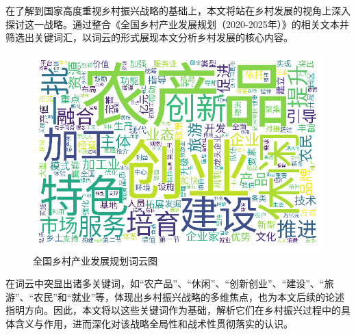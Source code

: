 在了解到国家高度重视乡村振兴战略的基础上，本文将站在乡村发展的视角上深入探讨这一战略。通过整合《全国乡村产业发展规划（2020-2025年）》的相关文本并筛选出关键词汇，以词云的形式展现本文分析乡村发展的核心内容。

\begin{figure}[H]
    \centering
    \includegraphics[width=0.6\linewidth]{figures/46.png}
    \caption{全国乡村产业发展规划词云图}
    \label{fig:enter-label}
\end{figure}

在词云中突显出诸多关键词，如“农产品”、“休闲”、“创新创业”、“建设”、“旅游”、“农民”和“就业”等，体现出乡村振兴战略的多维焦点，也为本文后续的论述指明方向。因此，本文将以这些关键词作为基础，解析它们在乡村振兴过程中的具体含义与作用，进而深化对该战略全局性和战术性贯彻落实的认识。